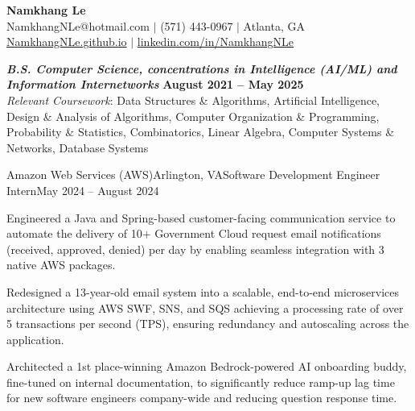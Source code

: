 \documentclass{article}
\begin{document}
\thispagestyle{empty}

\begin{center}
    \textbf{\LARGE Namkhang Le} \\
    NamkhangNLe@hotmail.com $|$ (571) 443-0967 $|$ Atlanta, GA \\
    \href{https://namkhangnle.github.io/}{NamkhangNLe.github.io} $|$ \href{https://www.linkedin.com/in/namkhangnle/}{linkedin.com/in/NamkhangNLe}
\end{center}

\begin{flushleft}


 {}
{\textbf{\textit{B.S. Computer Science, concentrations in Intelligence (AI/ML) and Information Internetworks}} \hfill \textbf{August 2021 -- May 2025} \\ \textit{Relevant Coursework}: Data Structures \& Algorithms, Artificial Intelligence, Design \& Analysis of Algorithms, Computer Organization \& Programming, Probability \& Statistics, Combinatorics, Linear Algebra, Computer Systems \& Networks, Database Systems }

    
    \begin{experience}{Amazon Web Services (AWS)}{Arlington, VA}{Software Development Engineer Intern}{May 2024 -- August 2024}
        \item Engineered a Java and Spring-based customer-facing communication service to automate the delivery of 10+ Government Cloud request email notifications (received, approved, denied) per day by enabling seamless integration with 3 native AWS packages.
        \item Redesigned a 13-year-old email system into a scalable, end-to-end microservices architecture using AWS SWF, SNS, and SQS achieving a processing rate of over 5 transactions per second (TPS), ensuring redundancy and autoscaling across the application.
        \item Architected a 1st place-winning Amazon Bedrock-powered AI onboarding buddy, fine-tuned on internal documentation, to significantly reduce ramp-up lag time for new software engineers company-wide and reducing question response time.

    \end{experience}


\end{flushleft}
\end{document}
